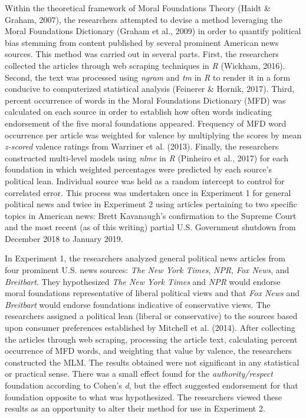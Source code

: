 \documentclass[english,,man]{apa6}
\begin{document}
Within the theoretical framework of Moral Foundations Theory (Haidt \& Graham, 2007), the researchers attempted to devise a method leveraging the Moral Foundations Dictionary (Graham et al., 2009) in order to quantify political bias stemming from content published by several prominent American news sources. This method was carried out in several parts. First, the researchers collected the articles through web scraping techniques in \emph{R} (Wickham, 2016). Second, the text was processed using \emph{ngram} and \emph{tm} in \emph{R} to render it in a form conducive to computerized statistical analysis (Feinerer \& Hornik, 2017). Third, percent occurrence of words in the Moral Foundations Dictionary (MFD) was calculated on each source in order to establish how often words indicating endorsement of the five moral foundations appeared. Frequency of MFD word occurrence per article was weighted for valence by multiplying the scores by mean \emph{z-scored} valence ratings from Warriner et al. (2013). Finally, the researchers constructed multi-level models using \emph{nlme} in \emph{R} (Pinheiro et al., 2017) for each foundation in which weighted percentages were predicted by each source's political lean. Individual source was held as a random intercept to control for correlated error. This process was undertaken once in Experiment 1 for general political news and twice in Experiment 2 using articles pertaining to two specific topics in American news: Brett Kavanaugh's confirmation to the Supreme Court and the most recent (as of this writing) partial U.S. Government shutdown from December 2018 to January 2019.

In Experiment 1, the researchers analyzed general political news articles from four prominent U.S. news sources: \emph{The New York Times}, \emph{NPR}, \emph{Fox News}, and \emph{Breitbart}. They hypothesized \emph{The New York Times} and \emph{NPR} would endorse moral foundations representative of liberal political views and that \emph{Fox News} and \emph{Breitbart} would endorse foundations indicative of conservative views. The researchers assigned a political lean (liberal or conservative) to the sources based upon consumer preferences established by Mitchell et al. (2014). After collecting the articles through web scraping, processing the article text, calculating percent occurrence of MFD words, and weighting that value by valence, the researchers constructed the MLM. The results obtained were not significant in any statistical or practical sense. There was a small effect found for the \emph{authority/respect} foundation according to Cohen's \emph{d}, but the effect suggested endorsement for that foundation opposite to what was hypothesized. The researchers viewed these results as an opportunity to alter their method for use in Experiment 2.
\end{document}
